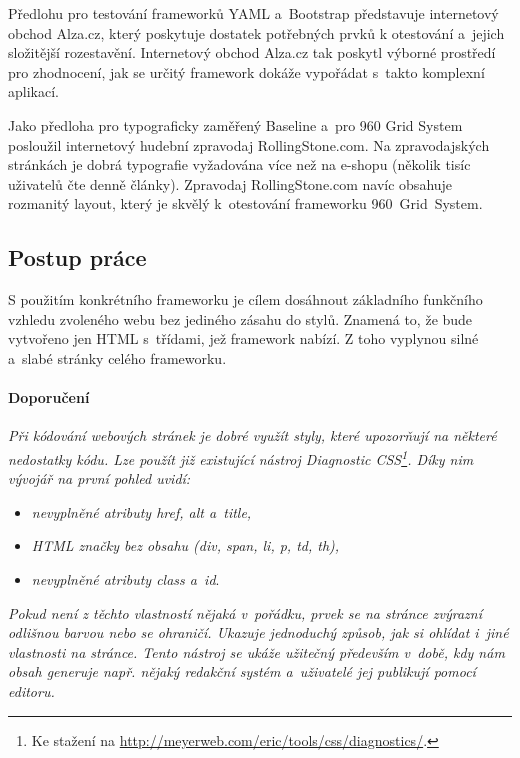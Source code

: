 \documentclass[thesis=B,czech]{FITthesis}[2012/06/26]
\begin{document}
Předlohu pro testování frameworků YAML a~Bootstrap představuje internetový obchod Alza.cz, který poskytuje dostatek potřebných prvků k otestování a~jejich složitější rozestavění. Internetový obchod Alza.cz tak poskytl výborné prostředí pro zhodnocení, jak se určitý framework dokáže vypořádat s~takto komplexní aplikací.

Jako předloha pro typograficky zaměřený Baseline a~pro 960 Grid System posloužil internetový hudební zpravodaj RollingStone.com. Na zpravodajských stránkách je dobrá typografie vyžadována více než na e-shopu (několik tisíc uživatelů čte denně články). Zpravodaj RollingStone.com  navíc obsahuje rozmanitý layout, který je skvělý k~otestování frameworku 960~Grid~System. 



\subsection{Postup práce}

S použitím konkrétního frameworku je cílem dosáhnout základního funkčního vzhledu zvoleného webu bez jediného zásahu do stylů. Znamená to, že bude vytvořeno jen HTML s~třídami, jež framework nabízí. Z toho vyplynou silné a~slabé stránky celého frameworku. 


\paragraph{Doporučení}

 \textit{Při kódování webových stránek je dobré využít styly, které upozorňují na některé nedostatky kódu. Lze použít již existující nástroj Diagnostic CSS\footnote{Ke stažení na \url{http://meyerweb.com/eric/tools/css/diagnostics/}.}. Díky nim vývojář na první pohled uvidí: }

\begin{itemize}
 \item \textit{nevyplněné atributy href, alt a~title,}
 \item \textit{HTML značky bez obsahu (div, span, li, p, td, th),}
 \item \textit{nevyplněné atributy class a~id}.
\end{itemize}
\textit{Pokud není z těchto vlastností nějaká v~pořádku, prvek se na stránce zvýrazní odlišnou barvou nebo se ohraničí. Ukazuje jednoduchý způsob, jak si ohlídat i~jiné vlastnosti na stránce. Tento nástroj se ukáže užitečný především v~době, kdy nám obsah generuje např. nějaký redakční systém a~uživatelé jej publikují pomocí editoru.}
\end{document}
